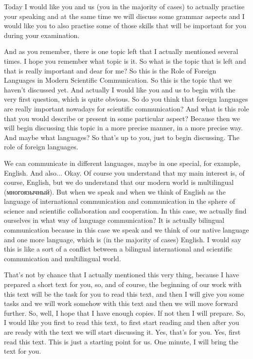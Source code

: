 \documentclass[main.tex]{subfiles}
\begin{document}

Today I would like you and us (you in the majority of cases) to actually practise your speaking and at the same time we will discuss some grammar aspects and I would like you to also practise some of those skills that will be important for you during your examination.

And as you remember, there is one topic left that I actually mentioned several times.
I hope you remember what topic is it.
So what is the topic that is left and that is really important and dear for me?
So this is the Role of Foreign Languages in Modern Scientific Communication.
So this is the topic that we haven't discussed yet.
And actually I would like you and us to begin with the very first question, which is quite obvious.
So do you think that foreign languages are really important nowadays for scientific communication?
And what is this role that you would describe or present in some particular aspect?
Because then we will begin discussing this topic in a more precise manner, in a more precise way.
And maybe what languages?
So that's up to you, just to begin discussing.
The role of foreign languages.

We can communicate in different languages, maybe in one special, for example, English.
And also...
Okay.
Of course you understand that my main interest is, of course, English, but we do understand that our modern world is multilingual (многоязычный).
But when we speak and when we think of English as the language of international communication and communication in the sphere of science and scientific collaboration and cooperation.
In this case, we actually find ourselves in what way of language communication?
It is actually bilingual communication because in this case we speak and we think of our native language and one more language, which is (in the majority of cases) English.
I would say this is like a sort of a conflict between a bilingual international and scientific communication and multilingual world.

That's not by chance that I actually mentioned this very thing, because I have prepared a short text for you, so, and of course, the beginning of our work with this text will be the task for you to read this text, and then I will give you some tasks and we will work somehow with this text and then we will move forward further.
So, well, I hope that I have enough copies.
If not then I will prepare.
So, I would like you first to read this text, to first start reading and then after you are ready with the text we will start discussing it.
Yes, that's for you.
Yes, first read this text.
This is just a starting point for us.
One minute, I will bring the text for you.
\end{document}
